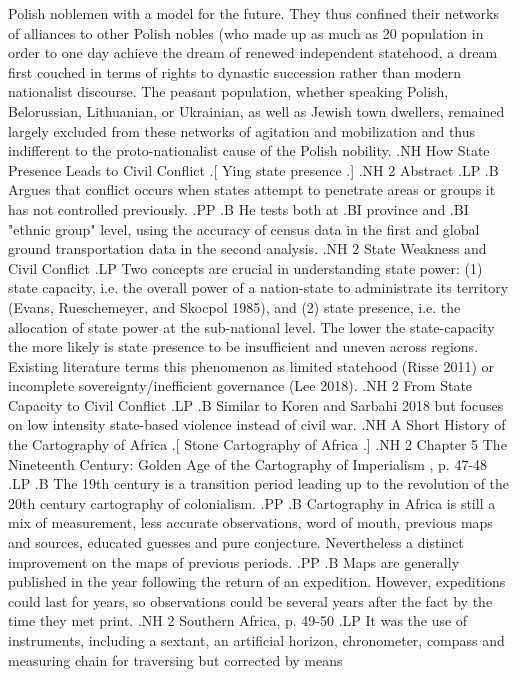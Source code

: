 \documentclass[12pt]{article}
\begin{document}
Polish noblemen with a model for the future.  They thus confined their networks
of alliances to other Polish nobles (who made up as much as 20%
population in order to one day achieve the dream of renewed independent
statehood, a dream first couched in terms of rights to dynastic succession
rather than modern nationalist discourse.  The peasant population, whether
speaking Polish, Belorussian, Lithuanian, or Ukrainian, as well as Jewish town
dwellers, remained largely excluded from these networks of agitation and
mobilization and thus indifferent to the proto-nationalist cause of the Polish
nobility.
.NH
How State Presence Leads to Civil Conflict
.[
Ying state presence
.]
.NH 2
Abstract
.LP
.B
Argues that conflict occurs when states attempt to penetrate areas or groups it
has not controlled previously.
.PP
.B
He tests both at
.BI province
and
.BI "ethnic group"
level, using the accuracy of census data in the first and global ground
transportation data in the second analysis.
.NH 2
State Weakness and Civil Conflict
.LP
Two concepts are crucial in understanding state power: (1) state capacity, i.e.
the overall power of a nation-state to administrate its territory (Evans,
Rueschemeyer, and Skocpol 1985), and (2) state presence, i.e. the allocation of
state power at the sub-national level. The lower the state-capacity the more
likely is state presence to be insufficient and uneven across regions. Existing
literature terms this phenomenon as limited statehood (Risse 2011) or
incomplete sovereignty/inefficient governance (Lee 2018).
.NH 2
From State Capacity to Civil Conflict
.LP
.B 
Similar to Koren and Sarbahi 2018 but focuses on low intensity state-based
violence instead of civil war.
.NH
A Short History of the Cartography of Africa
.[
Stone Cartography of Africa
.]
.NH 2
Chapter 5 The Nineteenth Century: Golden Age of the Cartography of Imperialism ,
p. 47-48 
.LP
.B
The 19th century is a transition period leading up to the revolution
of the 20th  century cartography of colonialism.
.PP
.B
Cartography in Africa is still a mix of measurement, less accurate observations,
word of mouth,  previous maps and sources, educated guesses and pure conjecture.
Nevertheless a distinct improvement on the maps of previous periods.
.PP
.B
Maps are generally published in the year following the return of an expedition.
However, expeditions could last for years, so observations could be several
years after the fact by the time they met print.
.NH 2
Southern Africa, p. 49-50
.LP
It was the use of instruments, including a sextant, an artificial horizon,
chronometer, compass and measuring chain for traversing but corrected by means
\end{document}
